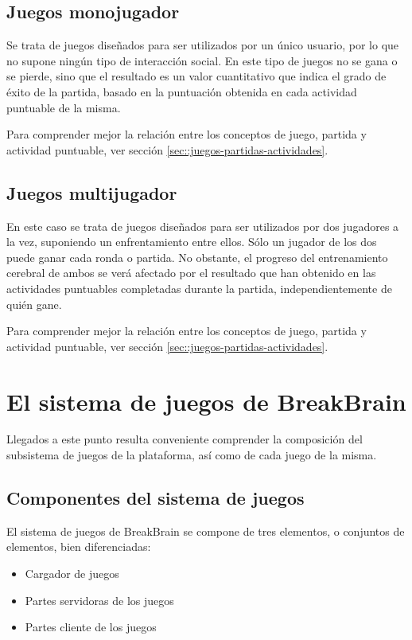 \subsection{Juegos monojugador}

Se trata de juegos diseñados para ser utilizados por un único usuario, por lo que no supone ningún tipo de interacción social. En este tipo de juegos no se gana o se pierde, sino que el resultado es un valor cuantitativo que indica el grado de éxito de la partida, basado en la puntuación obtenida en cada actividad puntuable de la misma.

Para comprender mejor la relación entre los conceptos de juego, partida y actividad puntuable, ver sección \ref{sec::juegos-partidas-actividades}.

\subsection{Juegos multijugador}

En este caso se trata de juegos diseñados para ser utilizados por dos jugadores a la vez, suponiendo un enfrentamiento entre ellos. Sólo un jugador de los dos puede ganar cada ronda o partida. No obstante, el progreso del entrenamiento cerebral de ambos se verá afectado por el resultado que han obtenido en las actividades puntuables completadas durante la partida, independientemente de quién gane.

Para comprender mejor la relación entre los conceptos de juego, partida y actividad puntuable, ver sección \ref{sec::juegos-partidas-actividades}.

\section{El sistema de juegos de BreakBrain}

Llegados a este punto resulta conveniente comprender la composición del subsistema de juegos de la plataforma, así como de cada juego de la misma.

\subsection{Componentes del sistema de juegos}

El sistema de juegos de BreakBrain se compone de tres elementos, o conjuntos de elementos, bien diferenciadas:

\begin{itemize}
\item Cargador de juegos
\item Partes servidoras de los juegos
\item Partes cliente de los juegos
\end{itemize}

